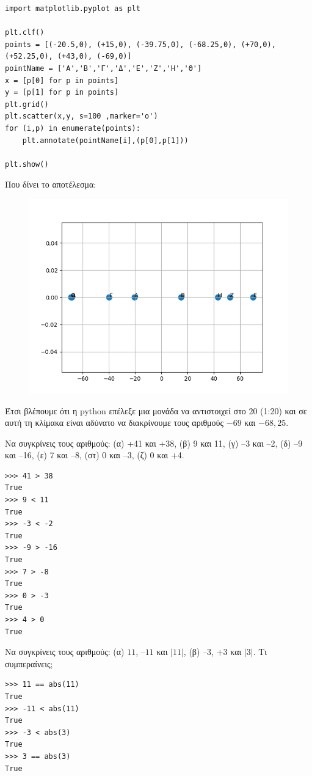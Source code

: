 \begin{lstlisting}
import matplotlib.pyplot as plt

plt.clf()
points = [(-20.5,0), (+15,0), (-39.75,0), (-68.25,0), (+70,0), (+52.25,0), (+43,0), (-69,0)]
pointName = ['Α','Β','Γ','Δ','Ε','Ζ','Η','Θ']
x = [p[0] for p in points]
y = [p[1] for p in points]
plt.grid()
plt.scatter(x,y, s=100 ,marker='o')
for (i,p) in enumerate(points):
    plt.annotate(pointName[i],(p[0],p[1]))

plt.show()
\end{lstlisting}
Που δίνει το αποτέλεσμα:
\begin{figure}[h]
\includegraphics{graph11.png}
\end{figure}
Έτσι βλέπουμε ότι η python επέλεξε μια μονάδα να αντιστοιχεί στο 20 (1:20) και σε αυτή τη κλίμακα είναι αδύνατο να διακρίνουμε τους αριθμούς $-69$ και $-68,25$.
\begin{exercise}
Να συγκρίνεις τους αριθμούς: (α) +41 και +38, (β) 9 και 11, (γ) –3 και –2, (δ) –9 και –16, (ε) 7 και –8, (στ) 0 και –3, (ζ) 0 και +4.
\end{exercise}
\begin{lstlisting}
>>> 41 > 38
True
>>> 9 < 11
True
>>> -3 < -2
True
>>> -9 > -16
True
>>> 7 > -8
True
>>> 0 > -3
True
>>> 4 > 0
True
\end{lstlisting}
\begin{exercise}
Να συγκρίνεις τους αριθμούς: (α) $11$, $–11$ και $|11|$, (β) $–3$, $+3$ και $|3|$. Τι συμπεραίνεις;
\end{exercise}
\begin{lstlisting}
>>> 11 == abs(11)
True
>>> -11 < abs(11)
True
>>> -3 < abs(3)
True
>>> 3 == abs(3)
True
\end{lstlisting}
